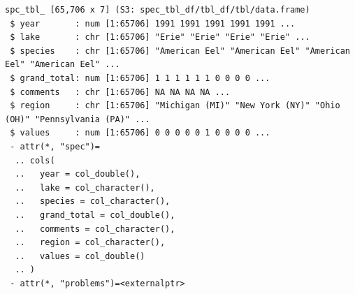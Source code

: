 \documentclass[
  letterpaper,
]{book}
\begin{document}
\begin{verbatim}
spc_tbl_ [65,706 x 7] (S3: spec_tbl_df/tbl_df/tbl/data.frame)
 $ year       : num [1:65706] 1991 1991 1991 1991 1991 ...
 $ lake       : chr [1:65706] "Erie" "Erie" "Erie" "Erie" ...
 $ species    : chr [1:65706] "American Eel" "American Eel" "American Eel" "American Eel" ...
 $ grand_total: num [1:65706] 1 1 1 1 1 1 0 0 0 0 ...
 $ comments   : chr [1:65706] NA NA NA NA ...
 $ region     : chr [1:65706] "Michigan (MI)" "New York (NY)" "Ohio (OH)" "Pennsylvania (PA)" ...
 $ values     : num [1:65706] 0 0 0 0 0 1 0 0 0 0 ...
 - attr(*, "spec")=
  .. cols(
  ..   year = col_double(),
  ..   lake = col_character(),
  ..   species = col_character(),
  ..   grand_total = col_double(),
  ..   comments = col_character(),
  ..   region = col_character(),
  ..   values = col_double()
  .. )
 - attr(*, "problems")=<externalptr> 
\end{verbatim}
\end{document}

